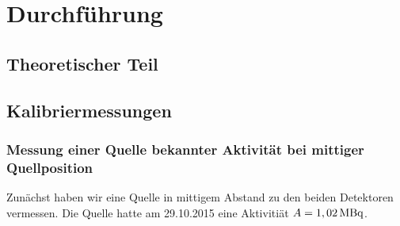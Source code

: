 \section{Durchführung}
\subsection{Theoretischer Teil}

\subsection{Kalibriermessungen}
    \subsubsection{Messung einer Quelle bekannter Aktivität bei mittiger Quellposition}
       Zunächst haben wir eine Quelle in mittigem Abstand zu den beiden Detektoren vermessen. Die Quelle hatte am 29.10.2015 eine Aktivitiät $A = \unit[1,02]{MBq}$.\\
       \vspace{2mm}
        

